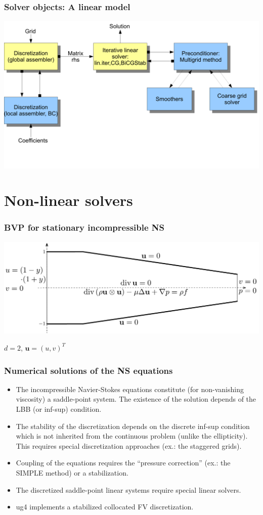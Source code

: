 \documentclass[xcolor=dvipsnames]{beamer}
\begin{document}
\begin {frame} [t]
\frametitle {Solver objects: A linear model}
\centerline {\includegraphics [width=1.15\textwidth] {LinearSolverFull}}
\end {frame}

\section {Non-linear solvers}

\begin{frame}
\frametitle{BVP for stationary incompressible NS}
\includegraphics [width=\textwidth] {NSDuese.pdf}

\vspace {2ex}
\centerline {$d = 2$, $\mathbf{u} = (u, v)^T$}
\end{frame}

\begin {frame} [t]
\frametitle {Numerical solutions of the NS equations}
\begin {itemize}
	\item The incompressible Navier-Stokes equations constitute (for non-vanishing viscosity)
		a saddle-point system. The existence of the solution depends of the LBB (or inf-sup)
		condition.
	\pause
	\item The stability of the discretization depends on the discrete inf-sup condition
		which is not inherited from the continuous problem (unlike the ellipticity).
		This requires special discretization approaches (ex.: the staggered grids).
	\pause
	\item Coupling of the equations requires the ``pressure correction''
		(ex.: the SIMPLE method) or a stabilization.
	\pause
	\item The discretized saddle-point linear systems require special linear solvers.
	\pause
	\item ug4 implements a {\color{blue} stabilized collocated FV discretization}.
\end {itemize}
\end {frame}
\end{document}

